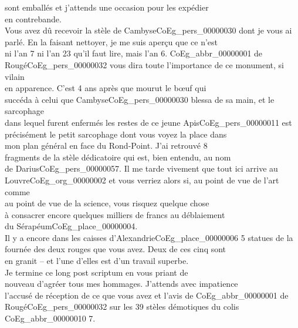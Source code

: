 \documentclass{book}
\begin{document}
\noindent sont emballés et j’attends une occasion pour les expédier\\
en contrebande.\\
\indent Vous avez dû recevoir la stèle de Cambyse\gls{CoEg_pers_00000030} dont je vous ai\\
parlé. En la faisant nettoyer, je me suis aperçu que ce n’est\\
ni l’an 7 ni l’an 23 qu’il faut lire, mais l’an 6. \gls{CoEg_abbr_00000001} de\\
Rougé\gls{CoEg_pers_00000032} vous dira toute l’importance de ce monument, si vilain\\
en apparence. C’est 4 ans après que mourut le bœuf qui\\
succéda à celui que Cambyse\gls{CoEg_pers_00000030} blessa de sa main, et le sarcophage\\
dans lequel furent enfermés les restes de ce jeune Apis\gls{CoEg_pers_00000011} est\\
précisément le petit sarcophage dont vous voyez la place dans\\
mon plan général en face du Rond-Point. J’ai retrouvé 8\\
fragments de la stèle dédicatoire qui est, bien entendu, au nom\\
de Darius\gls{CoEg_pers_00000057}. Il me tarde vivement que tout ici arrive au\\
Louvre\gls{CoEg_org_00000002} et vous verriez alors si, au point de vue de l’art comme\\
au point de vue de la science, vous risquez quelque chose\\
à consacrer encore quelques milliers de francs au déblaiement\\
du Sérapéum\gls{CoEg_place_00000004}.\\
\indent Il y a encore dans les caisses d’Alexandrie\gls{CoEg_place_00000006} 5 statues de la\\
fournée des deux rouges que vous avez. Deux de ces cinq sont\\
en granit – et l’une d’elles est d’un travail superbe.\\
\indent Je termine ce long post scriptum en vous priant de\\
nouveau d’agréer tous mes hommages. J’attends avec impatience\\
l’accusé de réception de ce que vous avez et l’avis de \gls{CoEg_abbr_00000001} de\\
Rougé\gls{CoEg_pers_00000032} sur les 39 stèles démotiques du colis \gls{CoEg_abbr_00000010} 7.
\end{document}
